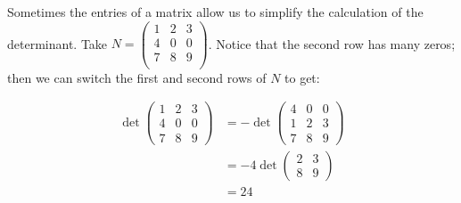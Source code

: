 \begin{example}
Sometimes the entries of a matrix allow us to simplify the calculation of the determinant.  Take $N= \begin{pmatrix}
1 & 2 & 3 \\
4 & 0 & 0 \\
7 & 8 & 9 \\
\end{pmatrix}$.  Notice that the second row has many zeros; then we can switch the first and second rows of $N$ to get:

\begin{align*}
\det \begin{pmatrix}
1 & 2 & 3 \\
4 & 0 & 0 \\
7 & 8 & 9
\end{pmatrix}
& = -\det \begin{pmatrix}
4 & 0 & 0 \\
1 & 2 & 3 \\
7 & 8 & 9
\end{pmatrix}\\
&= -4 \det \begin{pmatrix}
2 & 3 \\
8 & 9
\end{pmatrix} \\
&= 24
\end{align*}
\end{example}
 

